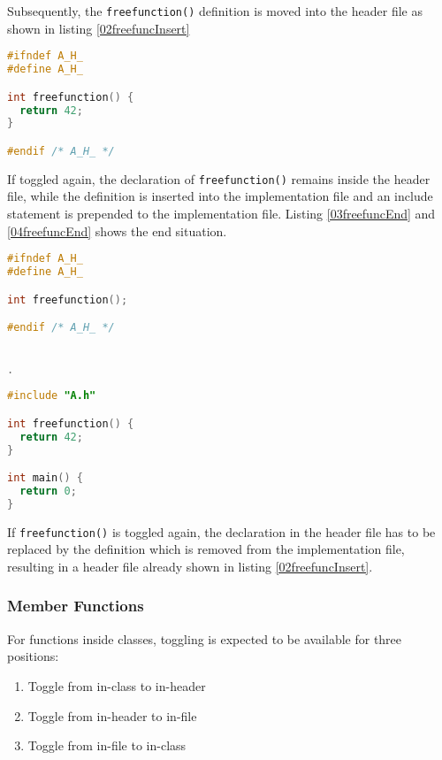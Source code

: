 Subsequently, the \texttt{freefunction()} definition is moved into the header
file as shown in listing \nolinebreak\ref{02freefuncInsert}

\begin{lstlisting}[caption={Inserted \texttt{freefunction()} in A.h},
label={02freefuncInsert}, language=C++]
#ifndef A_H_
#define A_H_

int freefunction() {
  return 42;
}

#endif /* A_H_ */
\end{lstlisting}

If toggled again, the declaration of \texttt{freefunction()} remains inside the
header file, while the definition is inserted into the implementation file and
an
include statement is prepended to the implementation file. Listing
\nolinebreak\ref{03freefuncEnd} and \ref{04freefuncEnd} shows the end
situation.

\vspace{0.5cm}
\begin{minipage}{.48\textwidth}
\lstset{xrightmargin=0.5cm}
\begin{lstlisting}[caption={A.h, inserted declaration},
label={03freefuncEnd}, language=C++]
#ifndef A_H_
#define A_H_

int freefunction();

#endif /* A_H_ */


.
\end{lstlisting}
\end{minipage}%
\begin{minipage}{.48\textwidth}
\lstset{xleftmargin=0.5cm}
\begin{lstlisting}[caption={A.cpp, inserted definition},
label={04freefuncEnd},language=C++]
#include "A.h"

int freefunction() {
  return 42;
}

int main() {
  return 0;
}
\end{lstlisting}
\end{minipage}

If \texttt{freefunction()} is toggled again, the declaration in the header file
has to be replaced by the definition which is removed from the implementation
file, resulting in a header file already shown in listing
\nolinebreak\ref{02freefuncInsert}.

\subsubsection{Member Functions}
For functions inside classes, toggling is expected to be available for three 
positions:
\begin{enumerate}
\item Toggle from in-class to in-header
\item Toggle from in-header to in-file
\item Toggle from in-file to in-class
\end{enumerate}

